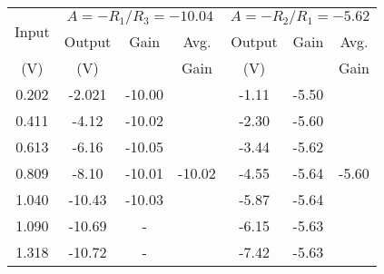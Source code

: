 \begin{table}[H]
    \centering
    \begin{tabular}{|c|ccc|ccc|}
    \hline
    \multirow{2}{*}{Input} & \multicolumn{3}{c|}{$A=-R_1/R_3=-10.04$}                                              & \multicolumn{3}{c|}{$A=-R_2/R_1=-5.62$}                                              \\ \cline{2-7} 
                 &   \multicolumn{1}{c|}{Output}              & \multicolumn{1}{c|}{Gain} &  Avg.              & \multicolumn{1}{c|}{Output}              & \multicolumn{1}{c|}{Gain} &  Avg.      \\ 
                 (V)       &   \multicolumn{1}{c|}{(V)}              & \multicolumn{1}{c|}{} &  Gain              & \multicolumn{1}{c|}{(V)}              & \multicolumn{1}{c|}{} & Gain      \\ \hline
    0.202             & \multicolumn{1}{c|}{-2.021} & \multicolumn{1}{c|}{-10.00} & \multirow{10}{*}{-10.02} & \multicolumn{1}{c|}{-1.11} & \multicolumn{1}{c|}{-5.50} & \multirow{11}{*}{-5.60} \\ \cline{1-3} \cline{5-6}
    0.411                  & \multicolumn{1}{c|}{-4.12} & \multicolumn{1}{c|}{-10.02} &                    & \multicolumn{1}{c|}{-2.30} & \multicolumn{1}{c|}{-5.60} &                    \\ \cline{1-3} \cline{5-6}
    0.613                  & \multicolumn{1}{c|}{-6.16} & \multicolumn{1}{c|}{-10.05} &                    & \multicolumn{1}{c|}{-3.44} & \multicolumn{1}{c|}{-5.62} &                    \\ \cline{1-3} \cline{5-6}
    0.809                  & \multicolumn{1}{c|}{-8.10} & \multicolumn{1}{c|}{-10.01} &                    & \multicolumn{1}{c|}{-4.55} & \multicolumn{1}{c|}{-5.64} &                    \\ \cline{1-3} \cline{5-6}
    1.040                  & \multicolumn{1}{c|}{-10.43} & \multicolumn{1}{c|}{-10.03} &                    & \multicolumn{1}{c|}{-5.87} & \multicolumn{1}{c|}{-5.64} &                    \\ \cline{1-3} \cline{5-6}
    1.090                  & \multicolumn{1}{c|}{-10.69} & \multicolumn{1}{c|}{-} &                    & \multicolumn{1}{c|}{-6.15} & \multicolumn{1}{c|}{-5.63} &                    \\ \cline{1-3} \cline{5-6}
    1.318                  & \multicolumn{1}{c|}{-10.72} & \multicolumn{1}{c|}{-} &                    & \multicolumn{1}{c|}{-7.42} & \multicolumn{1}{c|}{-5.63} &                    \\ \cline{1-3} \cline{5-6}

\end{tabular}
\end{table}
